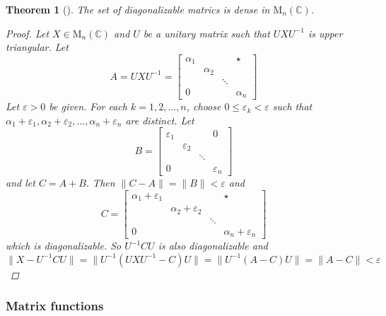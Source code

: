 \documentclass[letterpaper, 10pt]{article}
\theoremstyle{theostyle}
\newtheorem{theorem}{Theorem}[section]
\newenvironment{thmstyle}[1][]{%
    \begin{theorem}[#1]\leavevmode\vspace{-\baselineskip}\myquote%
    }{\endmyquote\end{theorem}}
\begin{document}
\begin{thmstyle}
    The set of diagonalizable matrics is dense in \(\mathrm{M}_n (\mathbb{C})\).

    \begin{proof}
        Let \(X \in \mathrm{M}_n(\mathbb{C})\) and \(U\) be a unitary matrix such that \(UXU^{-1}\) is upper triangular.
        Let
        \[A = UXU^{-1} = 
            \begin{bmatrix}
                \alpha_1 & & & \star \\
                & \alpha_2 & & \\
                & & \ddots & \\
                0 & & & \alpha_n
            \end{bmatrix}
        \]
        Let \(\varepsilon > 0\) be given.
        For each \(k = 1, 2, \dots, n\), choose \(0 \leq \varepsilon_k < \varepsilon\) such that 
        \(\alpha_1 + \varepsilon_1, \alpha_2 + \varepsilon_2, \dots, \alpha_n + \varepsilon_n\) are distinct.
        Let 
        \[B = 
            \begin{bmatrix}
                \varepsilon_1 & & & 0 \\
                & \varepsilon_2 & & \\
                & & \ddots & \\
                0 & & & \varepsilon_n
            \end{bmatrix}
        \]
        and let \(C = A + B\).
        Then \(\lVert C - A \rVert = \lVert B \rVert < \varepsilon\) and
        \[C = 
            \begin{bmatrix}
                \alpha_1 + \varepsilon_1 & & & \star \\
                & \alpha_2 + \varepsilon_2 & & \\
                & & \ddots & \\
                0 & & & \alpha_n + \varepsilon_n
            \end{bmatrix}
        \]
        which is diagonalizable.
        So \(U^{-1}CU\) is also diagonalizable and
        \[\lVert X - U^{-1}CU \rVert = \lVert U^{-1}\left(UXU^{-1} - C\right)U\rVert = \lVert U^{-1} (A-C)U\rVert = \lVert A - C \rVert < \varepsilon\]
    \end{proof}
\end{thmstyle}

\subsubsection{Matrix functions}
\end{document}
